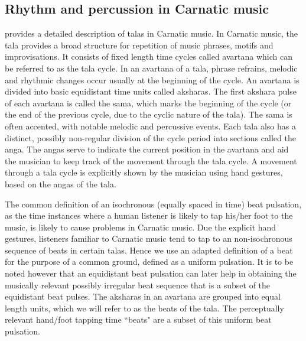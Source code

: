 \subsection{Rhythm and percussion in Carnatic music}\label{sec:bkgnd:carRhythmIntro}
 provides a detailed description of \glspl{tala} in Carnatic music. In Carnatic music, the \gls{tala} provides a broad structure for repetition of music phrases, motifs and improvisations. It consists of fixed length time cycles called \gls{avartana} which can be referred to as the \gls{tala} cycle. In an \gls{avartana} of a \gls{tala}, phrase refrains, melodic and rhythmic changes occur usually at the beginning of the cycle. An \gls{avartana} is divided into basic equidistant time units called \glspl{akshara}. The first \gls{akshara} pulse of each \gls{avartana} is called the \gls{sama}, which marks the beginning of the cycle (or the end of the previous cycle, due to the cyclic nature of the \gls{tala}). The \gls{sama} is often accented, with notable melodic and percussive events. Each \gls{tala} also has a distinct, possibly non-regular division of the cycle period into sections called the \gls{anga}. The \glspl{anga} serve to indicate the current position in the \gls{avartana} and aid the musician to keep track of the movement through the \gls{tala} cycle. A movement through a \gls{tala} cycle is explicitly shown by the musician using hand gestures, based on the \glspl{anga} of the \gls{tala}. 

The common definition of an isochronous  (equally spaced in time) beat pulsation, as the time instances where a human listener is likely to tap his/her foot to the music, is likely to cause problems in Carnatic music. Due the explicit hand gestures, listeners familiar to Carnatic music tend to tap to an non-isochronous sequence of beats in certain \glspl{tala}. Hence we use an adapted definition of a beat for the purpose of a common ground, defined as a uniform pulsation. It is to be noted however that an equidistant beat pulsation can later help in obtaining the musically relevant possibly irregular beat sequence that is a subset of the equidistant beat pulses. The \glspl{akshara} in an \gls{avartana} are grouped into equal length units, which we will refer to as the beats of the \gls{tala}. The perceptually relevant hand/foot tapping time ``beats" are a subset of this uniform beat pulsation. 

